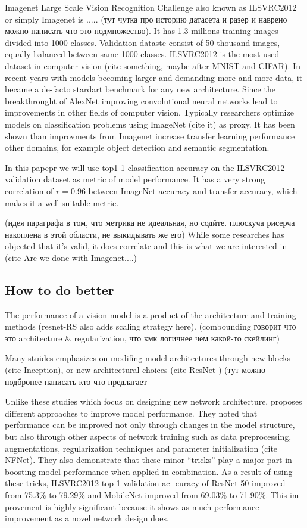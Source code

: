 Imagenet Large Scale Vision Recognition Challenge also known as ILSVRC2012 or simply Imagenet is ..... (тут чутка про историю датасета и разер и наврено можно написать что это подмножество). It has 1.3 millions training images divided into 1000 classes. Validation dataste consist of 50 thousand images, equally balanced between same 1000 classes. ILSVRC2012 is the most used dataset in computer vision (cite something, maybe after MNIST and CIFAR). In recent years with models becoming larger and demanding more and more data, it became a de-facto stardart benchmark for any new architecture. Since the breakthrought of AlexNet improving convolutional neural networks lead to improvements in other fields of computer vision. Typically researchers optimize models on classification problems using ImageNet (cite it) as proxy. It has been shown \cite{he2019bag_of_tricks} \cite{kornblith2019better} than improvments from Imagenet increase transfer learning performance other domains, for example object detection and semantic segmentation.


In this papepr we will use top1 1 classification accuracy on the ILSVRC2012 validation dataset as metric of model performance. It has a very strong correlation of $r=0.96$ \cite{kornblith2019better} between ImageNet accuracy and transfer accuracy, which makes it a well suitable metric.


(идея параграфа в том, что метрика не идеальная, но содйте. плюскуча рисерча накоплена в этой области, не выкидывать же его)
While some researches has objected that it's valid, it does correlate and this is what we are interested in (cite Are we done with Imagenet....) \cite{beyer2020_are_we_done}



\subsection{How to do better}


The performance of a vision model is a product of the architecture and training methods (resnet-RS also adds scaling strategy here).
(combounding говорит что это architecture \& regularization, что кмк логичнее чем какой-то скейлинг) 

Many stuides emphasizes on modifing model architectures through new blocks (cite Inception), or new architectural choices (cite ResNet ) (тут можно подбронее написать кто что предлагает

Unlike these studies which focus on designing new network architecture, \cite{he2019bag_of_tricks} proposes different approaches to improve model performance. They noted that performance can be improved not only through changes in the model structure, but also through other aspects of network training such as data preprocessing, augmentations, regularization techniques and parameter initialization (cite NFNet). They also demonstrate that these minor “tricks” play a major part in boosting model performance when applied in combination. As a result of using these tricks, ILSVRC2012 top-1 validation ac- curacy of ResNet-50 improved from 75.3\% to 79.29\% and MobileNet improved from 69.03\% to 71.90\%. This im- provement is highly significant because it shows as much performance improvement as a novel network design does. 

